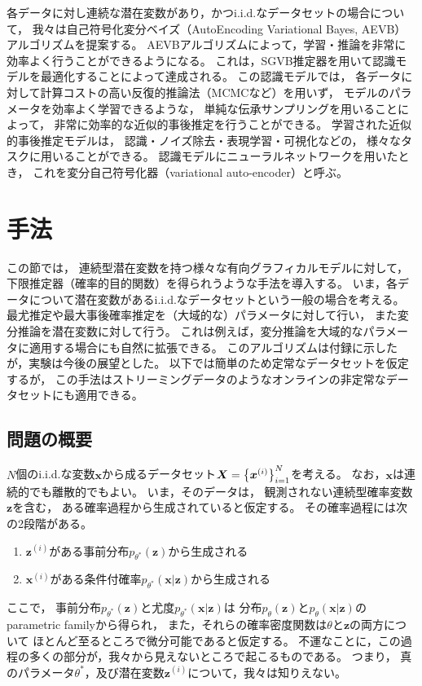 \documentclass[dvipdfmx, fleqn]{jsarticle}
\begin{document}
各データに対し連続な潜在変数があり，かつi.i.d.なデータセットの場合について，
我々は自己符号化変分ベイズ（AutoEncoding Variational Bayes, AEVB）アルゴリズムを提案する。
AEVBアルゴリズムによって，学習・推論を非常に効率よく行うことができるようになる。
これは，SGVB推定器を用いて認識モデルを最適化することによって達成される。
この認識モデルでは，
各データに対して計算コストの高い反復的推論法（MCMCなど）を用いず，
モデルのパラメータを効率よく学習できるような，
単純な伝承サンプリングを用いることによって，
非常に効率的な近似的事後推定を行うことができる。
学習された近似的事後推定モデルは，
認識・ノイズ除去・表現学習・可視化などの，
様々なタスクに用いることができる。
認識モデルにニューラルネットワークを用いたとき，
これを変分自己符号化器（variational auto-encoder）と呼ぶ。



\section{手法}

この節では，
連続型潜在変数を持つ様々な有向グラフィカルモデルに対して，
下限推定器（確率的目的関数）を得られうような手法を導入する。
いま，各データについて潜在変数があるi.i.d.なデータセットという一般の場合を考える。
最尤推定や最大事後確率推定を（大域的な）パラメータに対して行い，
また変分推論を潜在変数に対して行う。
これは例えば，変分推論を大域的なパラメータに適用する場合にも自然に拡張できる。
このアルゴリズムは付録に示したが，実験は今後の展望とした。
以下では簡単のため定常なデータセットを仮定するが，
この手法はストリーミングデータのようなオンラインの非定常なデータセットにも適用できる。


\subsection{問題の概要}

\(N\)個のi.i.d.な変数\(\bm{x}\)から成るデータセット\(\bm{X} = \qty{\bm{x}^{(i)}}_{i=1}^{N}\)を考える。
なお，\(\bm{x}\)は連続的でも離散的でもよい。
いま，そのデータは，
観測されない連続型確率変数\(\bm{z}\)を含む，
ある確率過程から生成されていると仮定する。
その確率過程には次の2段階がある。
\begin{enumerate}[label=(\arabic*)]
    \item \(\bm{z}^{(i)}\)がある事前分布\(p_{\theta^*} (\bm{z})\)から生成される
    \item \(\bm{x}^{(i)}\)がある条件付確率\(p_{\theta^*} (\bm{x}|\bm{z})\)から生成される
\end{enumerate}
ここで，
事前分布\(p_{\theta^*} (\bm{z})\)と尤度\(p_{\theta^*} (\bm{x}|\bm{z})\)は
分布\(p_{\theta} (\bm{z})\)と\(p_{\theta} (\bm{x}|\bm{z})\)のparametric familyから得られ，
また，それらの確率密度関数は\(\theta\)と\(\bm{z}\)の両方について
ほとんど至るところで微分可能であると仮定する。
不運なことに，この過程の多くの部分が，我々から見えないところで起こるものである。
つまり，
真のパラメータ\(\theta^*\)，及び潜在変数\(\bm{z}^{(i)}\)について，我々は知りえない。
\end{document}
